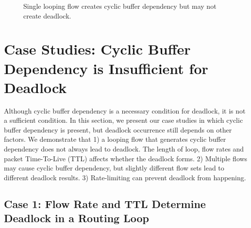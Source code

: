 \begin{figure}[t]
\centering
{}
\vspace{-0.15in}
\caption{Single looping flow creates cyclic buffer dependency but may not create deadlock.}
\vspace{-0.15in}
\label{fig:loop}
\end{figure}

\secspacelarge
\section{Case Studies: Cyclic Buffer Dependency is Insufficient for Deadlock}
\label{sec:analysis}
\secspace

Although cyclic buffer dependency is a necessary condition for deadlock, it is not a
sufficient condition. In this section, we present our case studies in which cyclic 
buffer dependency is present, but deadlock occurrence still depends on other factors. We demonstrate 
that 1) a looping flow that generates cyclic buffer dependency does not always lead to deadlock. 
The length of loop, flow rates and packet Time-To-Live (TTL) affects whether 
the deadlock forms. 2) Multiple flows may cause cyclic buffer dependency,
but slightly different flow sets lead to different deadlock results. 3) Rate-limiting can
prevent deadlock from happening.

\secspace
\subsection{Case 1: Flow Rate and TTL Determine Deadlock in a Routing Loop}
\secspace

